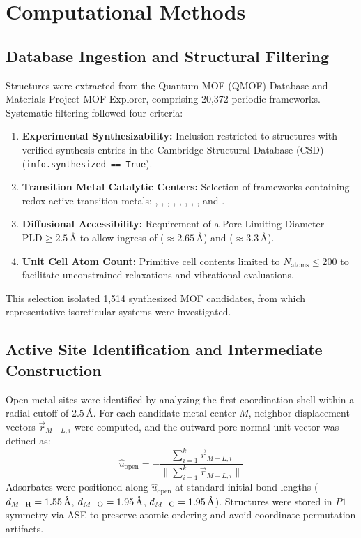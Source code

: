 \documentclass[journal=jacsat,manuscript=article]{achemso}
\begin{document}
\section{Computational Methods}

\subsection{Database Ingestion and Structural Filtering}
Structures were extracted from the Quantum MOF (QMOF) Database\cite{rosen2021machine} and Materials Project MOF Explorer, comprising 20,372 periodic frameworks. Systematic filtering followed four criteria:
\begin{enumerate}
    \item \textbf{Experimental Synthesizability:} Inclusion restricted to structures with verified synthesis entries in the Cambridge Structural Database (CSD) (\texttt{info.synthesized == True}).
    \item \textbf{Transition Metal Catalytic Centers:} Selection of frameworks containing redox-active transition metals: , , , , , , , , and .
    \item \textbf{Diffusional Accessibility:} Requirement of a Pore Limiting Diameter $\text{PLD} \ge 2.5\,\text{\AA}$ to allow ingress of  ($\approx 2.65\,\text{\AA}$) and  ($\approx 3.3\,\text{\AA}$).
    \item \textbf{Unit Cell Atom Count:} Primitive cell contents limited to $N_{\text{atoms}} \le 200$ to facilitate unconstrained relaxations and vibrational evaluations.
\end{enumerate}
This selection isolated 1,514 synthesized MOF candidates, from which representative isoreticular systems were investigated.

\subsection{Active Site Identification and Intermediate Construction}
Open metal sites were identified by analyzing the first coordination shell within a radial cutoff of $2.5\,\text{\AA}$. For each candidate metal center $M$, neighbor displacement vectors $\vec{r}_{M-L, i}$ were computed, and the outward pore normal unit vector was defined as:
\begin{equation}
\hat{u}_{\text{open}} = -\frac{\sum_{i=1}^{k} \vec{r}_{M-L, i}}{\|\sum_{i=1}^{k} \vec{r}_{M-L, i}\|}
\end{equation}
Adsorbates were positioned along $\hat{u}_{\text{open}}$ at standard initial bond lengths ($d_{M-\ce{H}} = 1.55\,\text{\AA}$, $d_{M-\ce{O}} = 1.95\,\text{\AA}$, $d_{M-\ce{C}} = 1.95\,\text{\AA}$). Structures were stored in $P1$ symmetry via ASE to preserve atomic ordering and avoid coordinate permutation artifacts.
\end{document}
